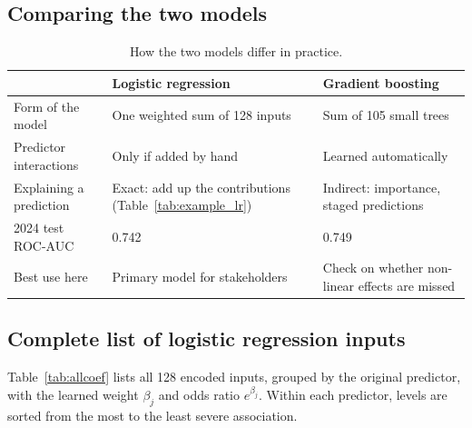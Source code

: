 \documentclass[11pt,a4paper]{article}
\begin{document}
\subsection{Comparing the two models}
\begin{table}[H]
\centering
\caption{How the two models differ in practice.}
\label{tab:modelcompare}
\footnotesize
\begin{tabularx}{\textwidth}{@{}P{3.2cm}LL@{}}
\toprule
 & \textbf{Logistic regression} & \textbf{Gradient boosting} \\
\midrule
Form of the model & One weighted sum of 128 inputs & Sum of 105 small trees \\
Predictor interactions & Only if added by hand & Learned automatically \\
Explaining a prediction & Exact: add up the contributions (Table~\ref{tab:example_lr}) & Indirect: importance, staged predictions \\
2024 test ROC-AUC & 0.742 & 0.749 \\
Best use here & Primary model for stakeholders & Check on whether non-linear effects are missed \\
\bottomrule
\end{tabularx}
\end{table}

\subsection{Complete list of logistic regression inputs}
Table~\ref{tab:allcoef} lists all 128 encoded inputs, grouped by the original predictor, with the learned weight $\beta_j$
and odds ratio $e^{\beta_j}$. Within each predictor, levels are sorted from the most to the least severe association.
\end{document}
